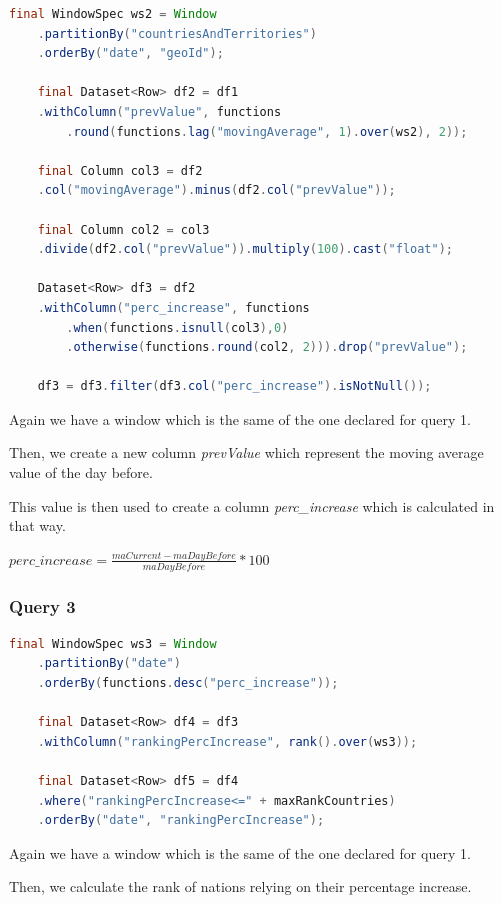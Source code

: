 \documentclass[table, 12pt]{article}
\begin{document}
\lstset{%
caption=,
basicstyle=\ttfamily\footnotesize\bfseries,
frame=tb
}
\begin{lstlisting}[language=Java, caption=Query 2]
	final WindowSpec ws2 = Window
	.partitionBy("countriesAndTerritories")
	.orderBy("date", "geoId");

	final Dataset<Row> df2 = df1
	.withColumn("prevValue", functions
		.round(functions.lag("movingAverage", 1).over(ws2), 2));

	final Column col3 = df2
	.col("movingAverage").minus(df2.col("prevValue"));

	final Column col2 = col3
	.divide(df2.col("prevValue")).multiply(100).cast("float");

	Dataset<Row> df3 = df2
	.withColumn("perc_increase", functions
		.when(functions.isnull(col3),0)
		.otherwise(functions.round(col2, 2))).drop("prevValue");

	df3 = df3.filter(df3.col("perc_increase").isNotNull());
\end{lstlisting}

Again we have a window which is the same of the one declared for query 1.

Then, we create a new column \textit{prevValue} which represent the moving average value of the day before.

This value is then used to create a column \textit{perc\_increase} which is calculated in that way.

$perc\_increase = \displaystyle{\frac{maCurrent - maDayBefore}{maDayBefore} * 100}$

\subsubsection{Query 3}
\lstset{%
caption=,
basicstyle=\ttfamily\footnotesize\bfseries,
frame=tb
}
\begin{lstlisting}[language=Java, caption=Query 3]
	final WindowSpec ws3 = Window
	.partitionBy("date")
	.orderBy(functions.desc("perc_increase"));

	final Dataset<Row> df4 = df3
	.withColumn("rankingPercIncrease", rank().over(ws3));

	final Dataset<Row> df5 = df4
	.where("rankingPercIncrease<=" + maxRankCountries)
	.orderBy("date", "rankingPercIncrease");
\end{lstlisting}
Again we have a window which is the same of the one declared for query 1.

Then, we calculate the rank of nations relying on their percentage increase.
\end{document}
